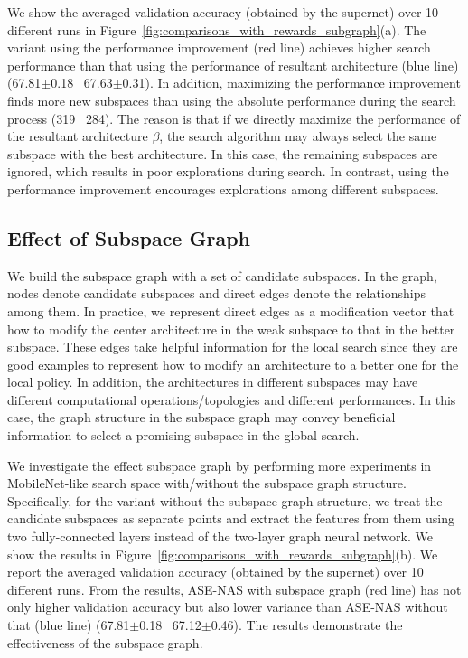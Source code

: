 \documentclass[lettersize,journal]{IEEEtran}
\newcommand{\sexyname}{ASE-NAS\xspace}
\begin{document}
We show the averaged validation accuracy (obtained by the supernet) over 10 different runs in Figure~\ref{fig:comparisons_with_rewards_subgraph}(a).
The variant using the performance improvement (red line) achieves higher search performance than that using the performance of resultant architecture (blue line) (67.81$\pm$0.18 \vs~67.63$\pm$0.31).
In addition, maximizing the performance improvement finds more new subspaces than using the absolute performance during the search process (319 \vs~284).
The reason is that if we directly maximize the performance of the resultant architecture $\beta$, the search algorithm may always select the same subspace with the best architecture.
In this case, the remaining subspaces are ignored, which results in poor explorations during search.
In contrast, using the performance improvement encourages explorations among different subspaces.


\subsection{Effect of Subspace Graph}\label{sec:ablation_subspace_graph}

We build the subspace graph with a set of candidate subspaces.
In the graph, nodes denote candidate subspaces and direct edges denote the relationships among them.
In practice, we represent direct edges as a modification vector that how to modify the center architecture in the weak subspace to that in the better subspace.
These edges take helpful information for the local search since they are good examples to represent how to modify an architecture to a better one for the local policy.
In addition, the architectures in different subspaces may have different computational operations/topologies and different performances.
In this case, the graph structure in the subspace graph may convey beneficial information to select a promising subspace in the global search.

We investigate the effect subspace graph by performing more experiments in MobileNet-like search space with/without the subspace graph structure.
Specifically, for the variant without the subspace graph structure, we treat the candidate subspaces as separate points and extract the features from them using two fully-connected layers instead of the two-layer graph neural network.
We show the results in Figure~\ref{fig:comparisons_with_rewards_subgraph}(b).
We report the averaged validation accuracy (obtained by the supernet) over 10 different runs.
From the results, \sexyname with subspace graph (red line) has not only higher validation accuracy but also lower variance than \sexyname without that (blue line) (67.81$\pm$0.18 \vs~67.12$\pm$0.46).
The results demonstrate the effectiveness of the subspace graph.
\end{document}
